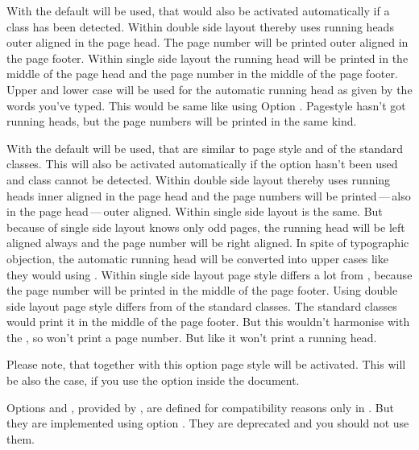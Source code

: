 With   the default will be used, that would
also be activated automatically if a \KOMAScript{} class has been
detected. Within double side layout thereby  uses
running heads outer aligned in the page head. The page number will be printed
outer aligned in the page footer. Within single side layout the running head
will be printed in the middle of the page head and the page number in the
middle of the page footer. Upper and lower case will be used for the automatic
running head as given by the words you've typed. This would be same like using
Option . Pagestyle
 hasn't got running heads, but the page numbers
will be printed in the same kind.

With   the default will be used, that are
similar to page style  and  of the
standard classes. This  will also be activated automatically if
the option hasn't been used and \KOMAScript{} class cannot be detected. Within
double side layout thereby  uses running heads inner
aligned in the page head and the page numbers will be printed\,---\,also in
the page head\,---\,outer aligned. Within single side layout
 is the same. But because of single side layout knows
only odd pages, the running head will be left aligned always and the page
number will be right aligned. In spite of typographic objection, the automatic
running head will be converted into upper cases like they would using
. Within single side
layout page style  differs a lot from
, because the page number will be printed in the middle
of the page footer. Using double side layout page style
 differs from  of the standard
classes. The standard classes would print it in the middle of the page
footer. But this wouldn't harmonise with the , so
 won't print a page number. But like
 it won't print a running head.

Please note, that together with this option page style
 will be activated. This will be also the case, if you
use the option inside the document.

%
%
Options  and , provided by
, are defined for compatibility reasons only in
. But they are implemented using option
. They are deprecated and you should not use them.%
%
%
%
%
%

